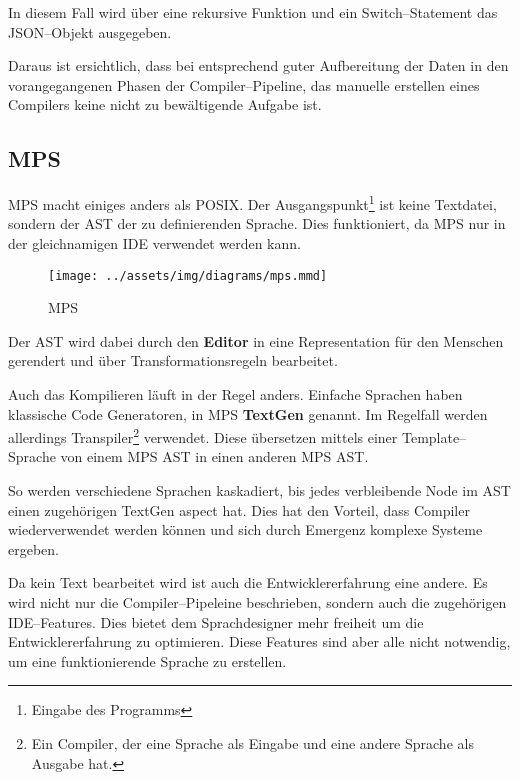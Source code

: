 In diesem Fall wird über eine rekursive Funktion und ein Switch--Statement das \acs{JSON}--Objekt ausgegeben.

Daraus ist ersichtlich, dass bei entsprechend guter Aufbereitung der Daten in den vorangegangenen Phasen der Compiler--Pipeline, das manuelle erstellen eines Compilers keine nicht zu bewältigende Aufgabe ist.

\subsection{\acl{MPS}}\label{subsec:meta-programming-system}
\ac{MPS} macht einiges anders als \ac{POSIX}.
Der Ausgangspunkt\footnote{Eingabe des Programms} ist keine Textdatei, sondern der \ac{AST} der zu definierenden Sprache.
Dies funktioniert, da \ac{MPS} nur in der gleichnamigen \ac{IDE} verwendet werden kann.

\begin{wrapfigure}{lH}{0.5\textwidth}
    \begin{center}
        \texttt{[image: ../assets/img/diagrams/mps.mmd]}
    \end{center}
    \caption{\acs{MPS} }
    \label{fig:mps-compiler-pipeline}
\end{wrapfigure}
Der \ac{AST} wird dabei durch den \textbf{Editor} in eine Representation für den Menschen gerendert und über Transformationsregeln bearbeitet.

Auch das Kompilieren läuft in der Regel anders.
Einfache Sprachen haben klassische Code Generatoren, in \ac{MPS} \textbf{TextGen} genannt.
Im Regelfall werden allerdings Transpiler\footnote{Ein Compiler, der eine Sprache als Eingabe und eine andere Sprache als Ausgabe hat.} verwendet.
Diese übersetzen mittels einer Template--Sprache von einem \ac{MPS} \ac{AST} in einen anderen \ac{MPS} \ac{AST}.

So werden verschiedene Sprachen kaskadiert, bis jedes verbleibende Node im \ac{AST} einen zugehörigen TextGen aspect hat.
Dies hat den Vorteil, dass Compiler wiederverwendet werden können und sich durch Emergenz komplexe Systeme ergeben.

Da kein Text bearbeitet wird ist auch die Entwicklererfahrung eine andere.
Es wird nicht nur die Compiler--Pipeleine beschrieben, sondern auch die zugehörigen \acs{IDE}--Features.
Dies bietet dem Sprachdesigner mehr freiheit um die Entwicklererfahrung zu optimieren.
Diese Features sind aber alle nicht notwendig, um eine funktionierende Sprache zu erstellen.

